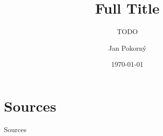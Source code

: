 \documentclass[czech,aspectratio=169]{beamer}
\title[short]{Full Title}
\subtitle{TODO}
\institute[FIT ČVUT v Praze]{Fakulta informačních technologií \\ České vysoké učení technické v Praze}
\author[J. Pokorný]{Jan Pokorný}
\date{\today}
\begin{document}
    \begin{frame}
        \titlepage 
    \end{frame}



    \section*{Sources}
    \begin{frame}{Sources}
        
        \printbibliography
    \end{frame}
\end{document}
